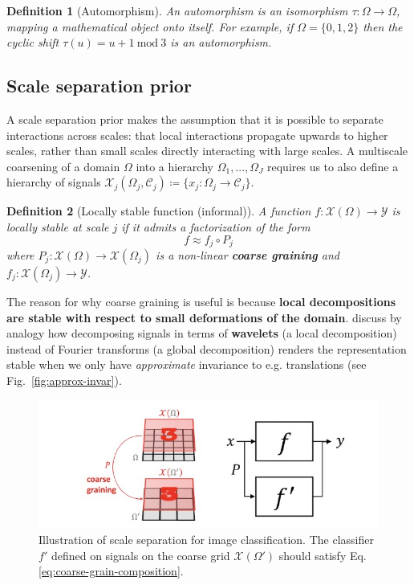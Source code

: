\documentclass[11pt]{article}
\numberwithin{equation}{section}
\newcommand{\defeq}{\coloneqq}
\newtheorem{defn}{Definition}[section]
\begin{document}
\begin{defn}[Automorphism]
An automorphism is an isomorphism $\tau : \Omega \rightarrow \Omega$, mapping a mathematical object onto itself. For example, if $\Omega = \{0,1,2\}$ then the cyclic shift $\tau(u) = u + 1\ \text{mod}\ 3$ is an automorphism.
\end{defn}

\subsection{Scale separation prior}
A scale separation prior makes the assumption that it is possible to separate interactions across scales: that local interactions propagate upwards to higher scales, rather than small scales directly interacting with large scales. A multiscale coarsening of a domain $\Omega$ into a hierarchy $\Omega_1,...,\Omega_J$ requires us to also define a hierarchy of signals $\mathcal{X}_j(\Omega_j, \mathcal{C}_j) \defeq \{x_j: \Omega_j \rightarrow \mathcal{C}_j\}$. 
\begin{defn}[Locally stable function (informal)]
A function $f:\mathcal{X}(\Omega) \rightarrow \mathcal{Y}$ is locally stable at scale $j$ if it admits a factorization of the form 
\begin{equation}
f \approx f_j \circ P_j \label{eq:coarse-grain-composition}
\end{equation}
where $P_j: \mathcal{X}(\Omega) \rightarrow \mathcal{X}(\Omega_j)$ is a non-linear \textbf{coarse graining} and $f_j: \mathcal{X}(\Omega_j) \rightarrow \mathcal{Y}$.
\end{defn}
The reason for why coarse graining is useful is because \textbf{local decompositions are stable with respect to small deformations of the domain}. \cite{Bronstein21} discuss by analogy how decomposing signals in terms of \textbf{wavelets} (a local decomposition) instead of Fourier transforms (a global decomposition) renders the representation stable when we only have \textit{approximate} invariance to e.g. translations (see Fig.~\ref{fig:approx-invar}).

\begin{figure}
\begin{center}
\includegraphics[width=0.7\columnwidth]{../figures/coarse-graining.jpg}  
\end{center}
\caption{Illustration of scale separation for image classification. The classifier $f'$ defined on signals on the coarse grid $\mathcal{X}(\Omega')$ should satisfy Eq.\eqref{eq:coarse-grain-composition}.
}
\label{fig:coarse-graining}
\end{figure}
\end{document}
